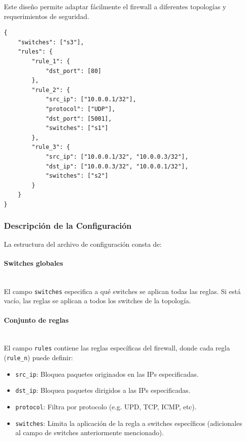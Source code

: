 Este diseño permite adaptar fácilmente el firewall a diferentes topologías y requerimientos de seguridad.

\newpage

\begin{lstlisting}[basicstyle=\ttfamily, frame=single, caption={Ejemplo de configuracion de reglas de Firewall}, label=lst:fw_rules]
{
    "switches": ["s3"],
    "rules": {
        "rule_1": {
            "dst_port": [80]
        },
        "rule_2": {
            "src_ip": ["10.0.0.1/32"],
            "protocol": ["UDP"],
            "dst_port": [5001],
            "switches": ["s1"]
        },
        "rule_3": {
            "src_ip": ["10.0.0.1/32", "10.0.0.3/32"],
            "dst_ip": ["10.0.0.3/32", "10.0.0.1/32"],
            "switches": ["s2"]
        }
    }
}
\end{lstlisting}

\subsubsection{Descripción de la Configuración}
La estructura del archivo de configuración consta de:

\paragraph{Switches globales} \hfill \\
El campo \texttt{switches} especifica a qué switches se aplican todas las reglas. Si está vacío, las reglas se aplican a todos los switches de la topología.

\paragraph{Conjunto de reglas} \hfill \\
El campo \texttt{rules} contiene las reglas específicas del firewall, donde cada regla (\texttt{rule\_n}) puede definir:

\begin{itemize}
    \item \texttt{src\_ip}: Bloquea paquetes originados en las IPs especificadas.
    \item \texttt{dst\_ip}: Bloquea paquetes dirigidos a las IPs especificadas.
    \item \texttt{protocol}: Filtra por protocolo (e.g. UPD, TCP, ICMP, etc).
    \item \texttt{switches}: Limita la aplicación de la regla a switches específicos (adicionales al campo de switches anteriormente mencionado).
\end{itemize}

